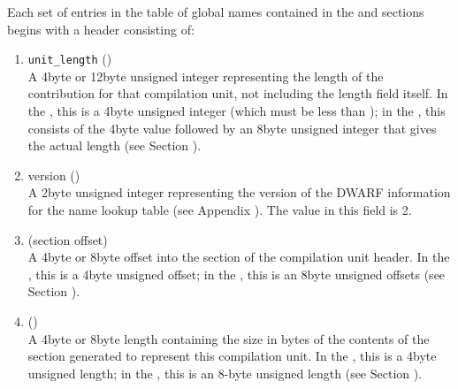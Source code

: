 Each set of entries in the table of global names contained
in the \dotdebugpubnames{} and 
\dotdebugpubtypes{} sections begins
with a header consisting of:
\begin{enumerate}[1. ]

\item \texttt{unit\_length} () \\
A 4\dash byte or 12\dash byte unsigned integer 
representing the length
of the \dotdebuginfo{}
contribution for that compilation unit,
not including the length field itself. In the 
\thirtytwobitdwarfformat, this is a 4\dash byte unsigned integer (which must be less
than \xfffffffzero); in the \sixtyfourbitdwarfformat, this consists
of the 4\dash byte value \wffffffff followed by an 8\dash byte unsigned
integer that gives the actual length
(see Section ).

\item  version () \\
A 2\dash byte unsigned integer representing the version of the
DWARF information for the name lookup table
(see Appendix ).
The value in this field is 2.

\item {} (section offset) \\
A 
4\dash byte or 8\dash byte 
offset into the 
\dotdebuginfo{}
section of the compilation unit header.
In the \thirtytwobitdwarfformat, this is a 4\dash byte unsigned offset;
in the \sixtyfourbitdwarfformat, this is an 8\dash byte unsigned offsets
(see Section ).

\item  {} () \\
A 
4\dash byte or 8\dash byte length containing the size in bytes of the
contents of the \dotdebuginfo{}
section generated to represent
this compilation unit. In the \thirtytwobitdwarfformat, this is
a 4\dash byte unsigned length; in the \sixtyfourbitdwarfformat, this
is an 8-byte unsigned length 
(see Section ).


\end{enumerate}

